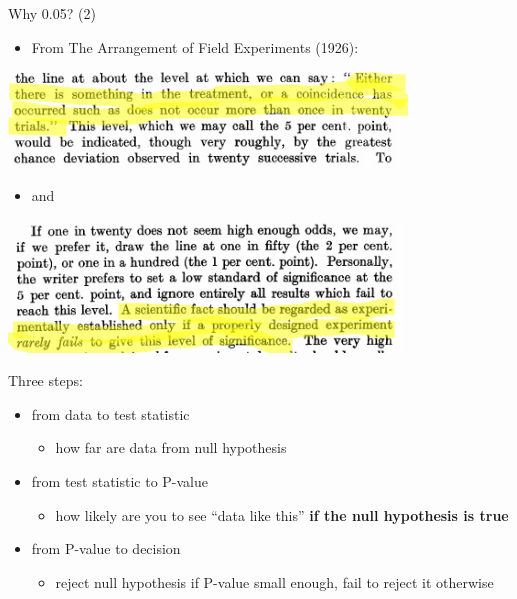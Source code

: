 \documentclass[ignorenonframetext,]{beamer}
\providecommand{\tightlist}{%
  \setlength{\itemsep}{0pt}\setlength{\parskip}{0pt}}
\begin{document}
\begin{frame}{Why 0.05? (2)}
\protect\hypertarget{why-0.05-2}{}

\begin{itemize}
\tightlist
\item
  From The Arrangement of Field Experiments (1926):
\end{itemize}

\includegraphics[width=4.16667in,height=\textheight]{fisher1.png}

\begin{itemize}
\tightlist
\item
  and
\end{itemize}

\includegraphics[width=4.16667in,height=\textheight]{fisher2.png}

\end{frame}

\begin{frame}{Three steps:}
\protect\hypertarget{three-steps}{}

\begin{itemize}
\tightlist
\item
  from data to test statistic

  \begin{itemize}
  \tightlist
  \item
    how far are data from null hypothesis
  \end{itemize}
\item
  from test statistic to P-value

  \begin{itemize}
  \tightlist
  \item
    how likely are you to see ``data like this'' \textbf{if the null
    hypothesis is true}
  \end{itemize}
\item
  from P-value to decision

  \begin{itemize}
  \tightlist
  \item
    reject null hypothesis if P-value small enough, fail to reject it
    otherwise
  \end{itemize}
\end{itemize}

\end{frame}
\end{document}

